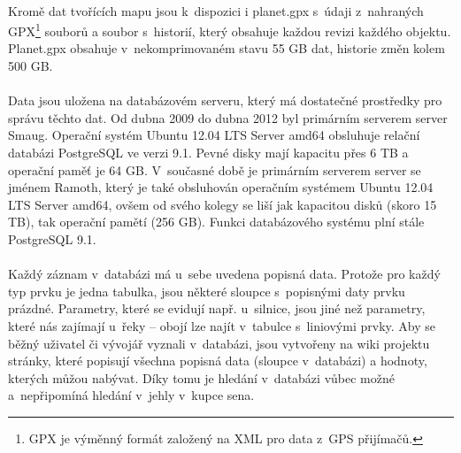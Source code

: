 \documentclass[11pt,a4paper,titlepage,oneside]{book}
\begin{document}


	\paragraph{} Kromě dat tvořících mapu jsou k~dispozici i planet.gpx s~údaji z~nahraných \ac{GPX}\footnote{\ac{GPX} je výměnný formát založený na \ac{XML} pro data z~GPS přijímačů.} souborů a soubor s~historií, který obsahuje každou revizi každého objektu. Planet.gpx obsahuje v~nekomprimovaném stavu 55 GB dat, historie změn kolem 500 GB\cite{osm_wiki_planet.gpx}. 



	\paragraph{} Data jsou uložena na databázovém serveru, který má dostatečné prostředky pro správu těchto dat. Od dubna 2009 do dubna 2012 byl primárním serverem server Smaug\cite{osm_wiki_smaug}. Operační systém Ubuntu 12.04 LTS Server amd64 obsluhuje relační databázi PostgreSQL ve verzi 9.1. Pevné disky mají kapacitu přes 6 TB a operační paměť je 64 GB. V~současné době je primárním serverem server se jménem Ramoth\cite{osm_wiki_ramoth}, který je také obsluhován operačním systémem Ubuntu 12.04 LTS Server amd64, ovšem od svého kolegy se liší jak kapacitou disků (skoro 15 TB), tak operační pamětí (256 GB). Funkci databázového systému plní stále PostgreSQL 9.1.



	\paragraph{}Každý záznam v~databázi má u~sebe uvedena popisná data. Protože pro každý typ prvku je jedna tabulka, jsou některé sloupce s~popisnými daty prvku prázdné. Parametry, které se evidují např. u~silnice, jsou jiné než parametry, které nás zajímají u~řeky -- obojí lze najít v~tabulce s~liniovými prvky. Aby se běžný uživatel či vývojář vyznali v~databázi, jsou vytvořeny na wiki projektu stránky, které popisují všechna popisná data (sloupce v~databázi) a hodnoty, kterých můžou nabývat. Díky tomu je hledání v~databázi vůbec možné a~nepřipomíná hledání v~jehly v~kupce sena.
\end{document}

